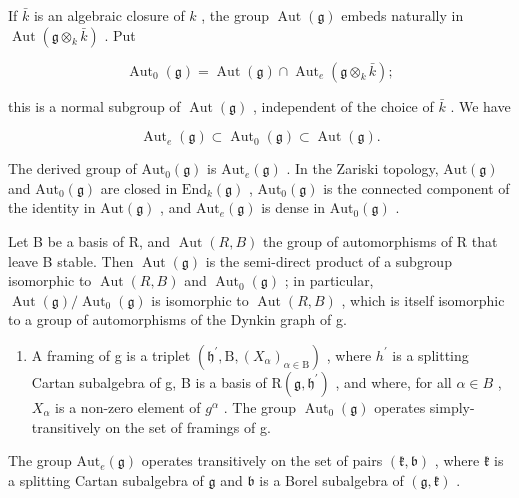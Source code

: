 If \(\bar{k}\) is an algebraic closure of \(k\) , the group \(\operatorname{Aut}(\mathfrak{g})\) embeds naturally in \(\operatorname{Aut}(\mathfrak{g} \otimes_k \bar{k})\) . Put

\[
\operatorname{Aut} _ {0} (\mathfrak {g}) = \operatorname{Aut} (\mathfrak {g}) \cap \operatorname{Aut} _ {e} (\mathfrak {g} \otimes_ {k} \bar {k});
\]

this is a normal subgroup of \(\operatorname{Aut}(\mathfrak{g})\) , independent of the choice of \(\bar{k}\) . We have

\[
\operatorname{Aut} _ {e} (\mathfrak {g}) \subset \operatorname{Aut} _ {0} (\mathfrak {g}) \subset \operatorname{Aut} (\mathfrak {g}).
\]

The derived group of \(\mathrm{Aut}_0(\mathfrak{g})\) is \(\mathrm{Aut}_e(\mathfrak{g})\) . In the Zariski topology, \(\mathrm{Aut}(\mathfrak{g})\) and \(\mathrm{Aut}_0(\mathfrak{g})\) are closed in \(\mathrm{End}_k(\mathfrak{g})\) , \(\mathrm{Aut}_0(\mathfrak{g})\) is the connected component of the identity in \(\mathrm{Aut}(\mathfrak{g})\) , and \(\mathrm{Aut}_e(\mathfrak{g})\) is dense in \(\mathrm{Aut}_0(\mathfrak{g})\) .

Let B be a basis of R, and \(\operatorname{Aut}(R,B)\) the group of automorphisms of R that leave B stable. Then \(\operatorname{Aut}(\mathfrak{g})\) is the semi-direct product of a subgroup isomorphic to \(\operatorname{Aut}(R,B)\) and \(\operatorname{Aut}_{0}(\mathfrak{g})\) ; in particular, \(\operatorname{Aut}(\mathfrak{g})/\operatorname{Aut}_{0}(\mathfrak{g})\) is isomorphic to \(\operatorname{Aut}(R,B)\) , which is itself isomorphic to a group of automorphisms of the Dynkin graph of g.

\begin{enumerate}
\def\labelenumi{\arabic{enumi})}
\setcounter{enumi}{16}
\tightlist
\item
  A framing of g is a triplet \((\mathfrak{h}^{\prime},\mathrm{B},(X_{\alpha})_{\alpha\in\mathrm{B}})\) , where \(h^{\prime}\) is a splitting Cartan subalgebra of g, B is a basis of \(\mathrm{R}(\mathfrak{g},\mathfrak{h}^{\prime})\) , and where, for all \(\alpha\in B\) , \(X_{\alpha}\) is a non-zero element of \(g^{\alpha}\) . The group \(\operatorname{Aut}_{0}(\mathfrak{g})\) operates simply-transitively on the set of framings of g.
\end{enumerate}

The group \(\mathrm{Aut}_e(\mathfrak{g})\) operates transitively on the set of pairs \((\mathfrak{k},\mathfrak{b})\) , where \(\mathfrak{k}\) is a splitting Cartan subalgebra of \(\mathfrak{g}\) and \(\mathfrak{b}\) is a Borel subalgebra of \((\mathfrak{g},\mathfrak{k})\) .

